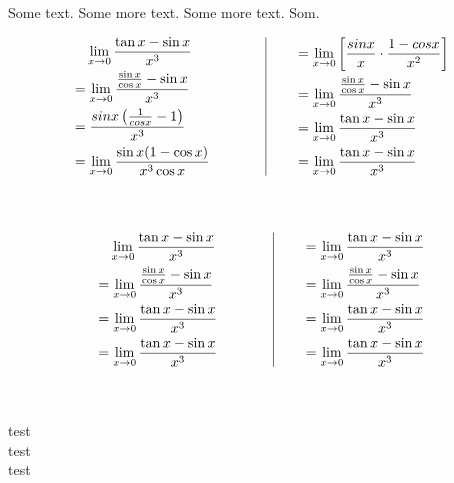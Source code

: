 \documentclass[17pt]{extarticle}
\begin{document}
\noindent
Some text. Some more text. Some more text. Som.
\begin{fleqn} 
\begin{equation} \nonumber
\begin{alignedat}{4}
& \texttt{\ \ } \lim_{x \to 0} \frac{\tan{x} - \sin{x}}{x^3}\\
&= \lim_{x \to 0} \frac{\frac{\sin{x}}{\cos{x}}-\sin{x}}{x^3}\\
&= \frac{sin x\left(\frac{1}{cos x} - 1\right)}{x^3}\\
&= \lim_{x \to 0} \frac{\sin{x}(1  - \cos{x})}{x^3\cos{x}}\\
\end{alignedat}
\qquad
\qquad
\vrule
\qquad
\begin{alignedat}{4}
&= \lim_{x \to 0}\left[\frac{sin x}{x}\cdot\frac{1 - cos x}{x^2} \right] \\
&= \lim_{x \to 0} \frac{\frac{\sin{x}}{\cos{x}}-\sin{x}}{x^3}\\
&= \lim_{x \to 0} \frac{\tan{x} - \sin{x}}{x^3}\\
&= \lim_{x \to 0} \frac{\tan{x} - \sin{x}}{x^3}\\
\end{alignedat}
\end{equation}\\\\
\begin{equation} \nonumber
\begin{alignedat}{4}
& \texttt{\ \ } \lim_{x \to 0} \frac{\tan{x} - \sin{x}}{x^3}\\
&= \lim_{x \to 0} \frac{\frac{\sin{x}}{\cos{x}}-\sin{x}}{x^3}\\
&= \lim_{x \to 0} \frac{\tan{x} - \sin{x}}{x^3}\\
&= \lim_{x \to 0} \frac{\tan{x} - \sin{x}}{x^3}\\
\end{alignedat}
\qquad
\qquad
\vrule
\qquad
\begin{alignedat}{4}
&= \lim_{x \to 0} \frac{\tan{x} - \sin{x}}{x^3}\\
&= \lim_{x \to 0} \frac{\frac{\sin{x}}{\cos{x}}-\sin{x}}{x^3}\\
&= \lim_{x \to 0} \frac{\tan{x} - \sin{x}}{x^3}\\
&= \lim_{x \to 0} \frac{\tan{x} - \sin{x}}{x^3}\\
\end{alignedat}
\end{equation}
\end{fleqn}\\\\
test\\
test\\
test
\end{document}
